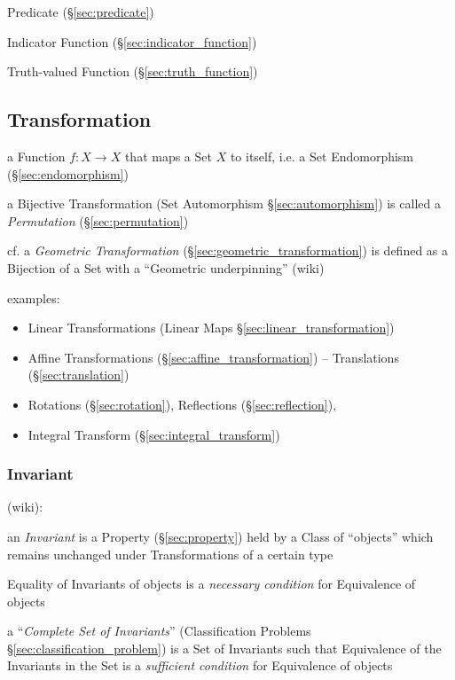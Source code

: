 Predicate (\S\ref{sec:predicate})

Indicator Function (\S\ref{sec:indicator_function})

Truth-valued Function (\S\ref{sec:truth_function})



\subsection{Transformation}\label{sec:transformation}

a Function $f : X \to X$ that maps a Set $X$ to itself, i.e. a Set
Endomorphism (\S\ref{sec:endomorphism})

a Bijective Transformation (Set Automorphism \S\ref{sec:automorphism}) is called
a \emph{Permutation} (\S\ref{sec:permutation})

cf. a \emph{Geometric Transformation} (\S\ref{sec:geometric_transformation}) is
defined as a Bijection of a Set with a ``Geometric underpinning'' (wiki)

examples:

\begin{itemize}
  \item Linear Transformations (Linear Maps \S\ref{sec:linear_transformation})
  \item Affine Transformations (\S\ref{sec:affine_transformation}) --
    Translations (\S\ref{sec:translation})
  \item Rotations (\S\ref{sec:rotation}), Reflections (\S\ref{sec:reflection}),
  \item Integral Transform (\S\ref{sec:integral_transform})
\end{itemize}



\subsubsection{Invariant}\label{sec:invariant}

(wiki):

an \emph{Invariant} is a Property (\S\ref{sec:property}) held by a Class
of ``objects'' which remains unchanged under Transformations of a certain type

Equality of Invariants of objects is a \emph{necessary condition} for
Equivalence of objects

a ``\emph{Complete Set of Invariants}'' (Classification Problems
\S\ref{sec:classification_problem}) is a Set of Invariants such that Equivalence
of the Invariants in the Set is a \emph{sufficient condition} for Equivalence of
objects

